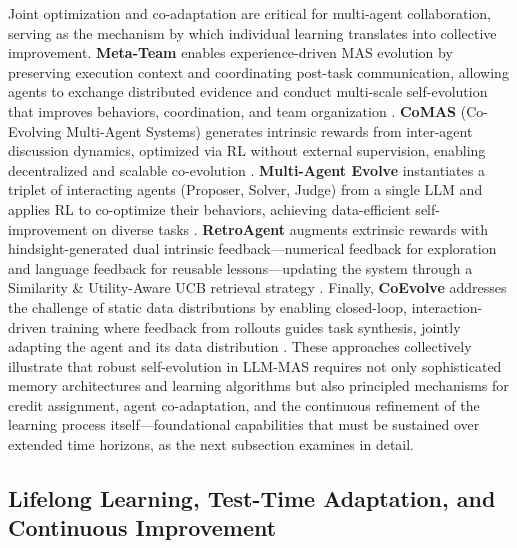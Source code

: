 \documentclass[11pt]{article}
\begin{document}
Joint optimization and co-adaptation are critical for multi-agent collaboration, serving as the mechanism by which individual learning translates into collective improvement. \textbf{Meta-Team} enables experience-driven MAS evolution by preserving execution context and coordinating post-task communication, allowing agents to exchange distributed evidence and conduct multi-scale self-evolution that improves behaviors, coordination, and team organization \cite{ref29}. \textbf{CoMAS} (Co-Evolving Multi-Agent Systems) generates intrinsic rewards from inter-agent discussion dynamics, optimized via RL without external supervision, enabling decentralized and scalable co-evolution \cite{ref164}. \textbf{Multi-Agent Evolve} instantiates a triplet of interacting agents (Proposer, Solver, Judge) from a single LLM and applies RL to co-optimize their behaviors, achieving data-efficient self-improvement on diverse tasks \cite{ref165}. \textbf{RetroAgent} augments extrinsic rewards with hindsight-generated dual intrinsic feedback---numerical feedback for exploration and language feedback for reusable lessons---updating the system through a Similarity \& Utility-Aware UCB retrieval strategy \cite{ref166}. Finally, \textbf{CoEvolve} addresses the challenge of static data distributions by enabling closed-loop, interaction-driven training where feedback from rollouts guides task synthesis, jointly adapting the agent and its data distribution \cite{ref167}. These approaches collectively illustrate that robust self-evolution in LLM-MAS requires not only sophisticated memory architectures and learning algorithms but also principled mechanisms for credit assignment, agent co-adaptation, and the continuous refinement of the learning process itself---foundational capabilities that must be sustained over extended time horizons, as the next subsection examines in detail.

\subsection{Lifelong Learning, Test-Time Adaptation, and Continuous Improvement}
\end{document}
